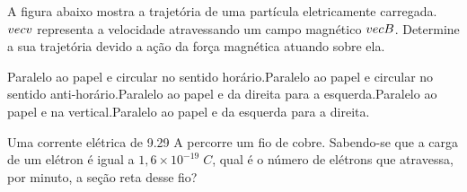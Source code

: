 \documentclass[12pt, addpoints]{exam}
\begin{document}
        \begin{questions}
\begin{multicols*}{2}
\question[20] A ﬁgura abaixo mostra a trajetória de uma partícula eletricamente carregada. $\\vec{{v}}$ representa a velocidade atravessando um campo magnético $\\vec{{B}}$. Determine a sua trajetória devido a ação da força magnética atuando sobre ela.
        
        \begin{center}
            \begin{minipage}[c]{0.5\linewidth}
            \end{minipage}
        \end{center}

        

\begin{choices}
\choice Paralelo ao papel e circular no sentido horário.\choice Paralelo ao papel e circular no sentido anti-horário.\choice Paralelo ao papel e da direita para a esquerda.\choice Paralelo ao papel e na vertical.\choice Paralelo ao papel e da esquerda para a direita.\end{choices}
\question[20] Uma corrente elétrica de    9.29 A percorre um ﬁo de cobre. Sabendo-se que a carga de um elétron é igual a $1,6\times 10^{-19}\;C$, qual é o número de elétrons que atravessa, por minuto, a seção reta desse ﬁo?


\end{multicols*}
\end{questions}
\end{document}
